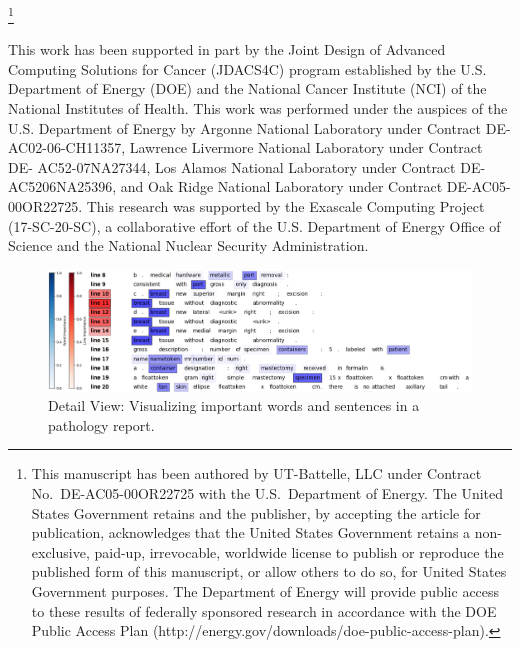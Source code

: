 \documentclass{vgtc}                          %
\begin{document}
\let\thefootnote\relax\footnote{\tiny{This manuscript has been authored by UT-Battelle, LLC under Contract No.\ DE-AC05-00OR22725 with the U.S.\ Department of Energy. The United States Government retains and the publisher, by accepting the article for publication, acknowledges that the United States Government retains a non-exclusive, paid-up, irrevocable, worldwide license to publish or reproduce the published form of this manuscript, or allow others to do so, for United States Government purposes. The Department of Energy will provide public access to these results of federally sponsored research in accordance with the DOE Public Access Plan (http://energy.gov/downloads/doe-public-access-plan).}}







\begin{acknowledgments}
This work has been supported in part by the Joint Design of Advanced Computing Solutions for Cancer (JDACS4C) program established by the U.S. Department of Energy (DOE) and the National Cancer Institute (NCI) of the National Institutes of Health. This work was performed under the auspices of the U.S. Department of Energy by Argonne National Laboratory under Contract DE-AC02-06-CH11357, Lawrence Livermore National Laboratory under Contract DE- AC52-07NA27344, Los Alamos National Laboratory under Contract DE-AC5206NA25396, and Oak Ridge National Laboratory under Contract DE-AC05-00OR22725. This research was supported by the Exascale Computing Project (17-SC-20-SC), a collaborative effort of the U.S. Department of Energy Office of Science and the National Nuclear Security Administration.
\end{acknowledgments}

%

%
%
%



\begin{figure}[tb]
\centering
\includegraphics[width=1.0\linewidth]{doc-image}
\caption{Detail View: Visualizing important words and sentences in a pathology report.}
\label{fig:detail-view}
\end{figure}
\end{document}
